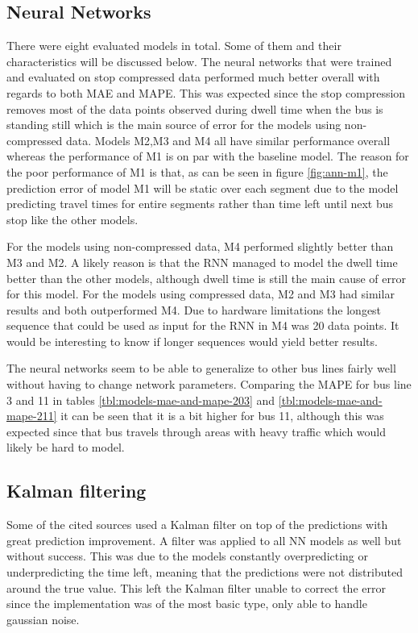 \subsection{Neural Networks}
There were eight evaluated models in total. Some of them and their characteristics will be discussed below. The neural networks that were trained and evaluated on stop compressed data performed much better overall with regards to both MAE and MAPE. This was expected since the stop compression removes most of the data points observed during dwell time when the bus is standing still which is the main source of error for the models using non-compressed data. Models M2,M3 and M4 all have similar performance overall whereas the performance of M1 is on par with the baseline model. The reason for the poor performance of M1 is that, as can be seen in figure \ref{fig:ann-m1}, the prediction error of model M1 will be static over each segment due to the model predicting travel times for entire segments rather than time left until next bus stop like the other models.

For the models using non-compressed data, M4 performed slightly better than M3 and M2. A likely reason is that the RNN managed to model the dwell time better than the other models, although dwell time is still the main cause of error for this model. For the models using compressed data, M2 and M3 had similar results and both outperformed M4. Due to hardware limitations the longest sequence that could be used as input for the RNN in M4 was 20 data points. It would be interesting to know if longer sequences would yield better results.

The neural networks seem to be able to generalize to other bus lines fairly well without having to change network parameters. Comparing the MAPE for bus line 3 and 11 in tables \ref{tbl:models-mae-and-mape-203} and \ref{tbl:models-mae-and-mape-211} it can be seen that it is a bit higher for bus 11, although this was expected since that bus travels through areas with heavy traffic which would likely be hard to model.

\subsection{Kalman filtering}
Some of the cited sources used a Kalman filter on top of the predictions with great prediction improvement. A filter was applied to all NN models as well but without success. This was due to the models constantly overpredicting or underpredicting the time left, meaning that the predictions were not distributed around the true value. This left the Kalman filter unable to correct the error since the implementation was of the most basic type, only able to handle gaussian noise. 

